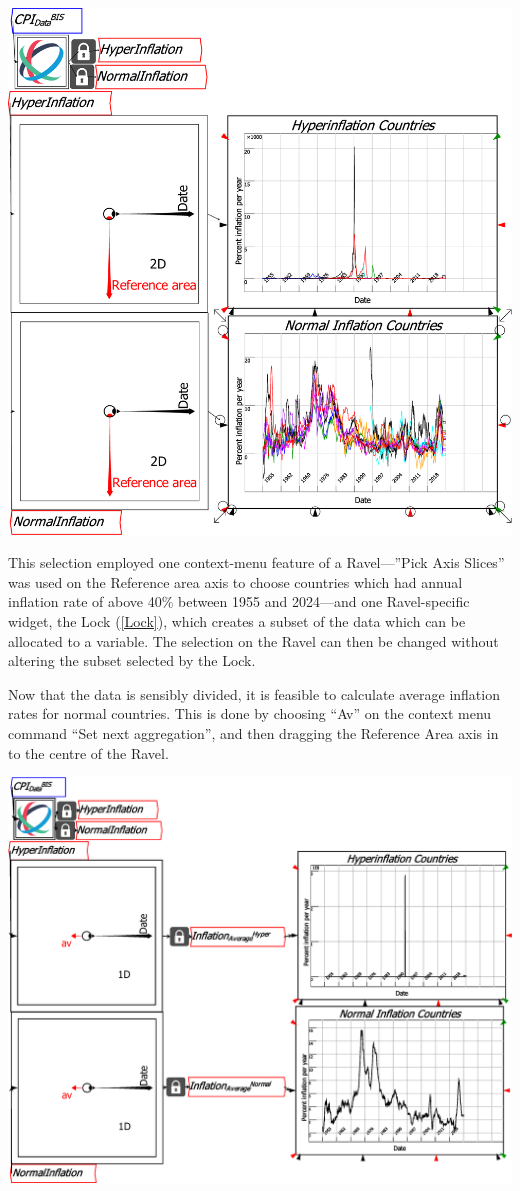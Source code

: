 \includegraphics[width=15cm]{images/RavelDataLockedSubsets}

This selection employed one context-menu feature of a Ravel---''Pick
Axis Slices'' was used on the Reference area axis to choose countries
which had annual inflation rate of above 40\% between 1955 and 2024---and
one Ravel-specific widget, the Lock (\ref{Lock}), which creates a
subset of the data which can be allocated to a variable. The selection
on the Ravel can then be changed without altering the subset selected
by the Lock.

Now that the data is sensibly divided, it is feasible to calculate
average inflation rates for normal countries. This is done by choosing
``Av'' on the context menu command ``Set next aggregation'', and
then dragging the Reference Area axis in to the centre of the Ravel.

\includegraphics[width=15cm]{images/CPI_SubsetsAverages}

